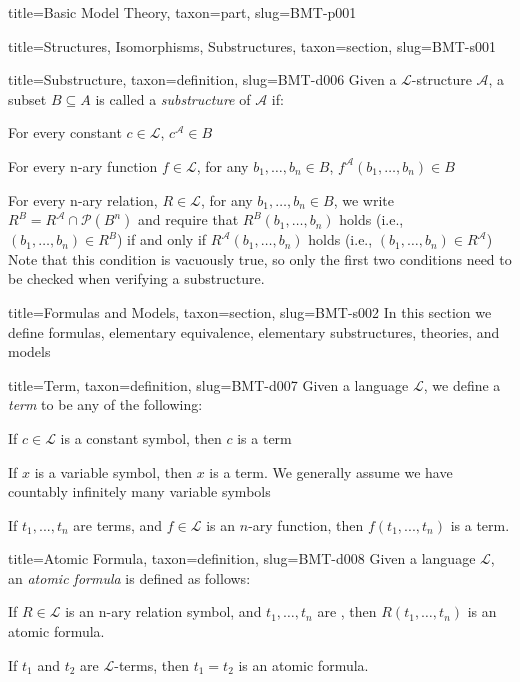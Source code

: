 \documentclass[a4paper]{article}
\begin{document}
\begin{tree}{title={Basic Model Theory}, taxon={part}, slug={BMT-p001}}
\begin{tree}{title={Structures, Isomorphisms, Substructures}, taxon={section}, slug={BMT-s001}}
\begin{tree}{title={Substructure}, taxon={definition}, slug={BMT-d006}}
Given a \(\mathcal {L}\)-structure \(\mathcal {A}\), a subset \(B  \subseteq  A\) is called a \emph{substructure} of \(\mathcal {A}\) if:\par{For every constant \(c \in   \mathcal {L}\), \(c^{ \mathcal {A}}  \in  B\)}\par{For every n-ary function \(f \in   \mathcal {L}\), for any \(b_1, \dots , b_n  \in  B\), \(f^{ \mathcal {A}}(b_1, \dots ,b_n)  \in  B\)}\par{For every n-ary relation, \(R \in   \mathcal {L}\), for any \(b_1, \dots , b_n  \in  B\), we write \(R^B = R^{ \mathcal {A}} \cap   \mathcal {P}(B^n)\) and require that
\(R^{B}(b_1, \dots , b_n)\) holds (i.e., \((b_1, \dots , b_n)  \in  R^{B}\))  if and only if \(R^{ \mathcal {A}}(b_1, \dots , b_n)\) holds (i.e., \((b_1, \dots , b_n)  \in  R^{ \mathcal {A}}\)) 
Note that this condition is vacuously true, so only the first two conditions need to be checked when verifying a substructure.}
\end{tree}

\end{tree}


  
  
\begin{tree}{title={Formulas and Models}, taxon={section}, slug={BMT-s002}}
In this section we define formulas, elementary equivalence, elementary substructures, theories, and models
\begin{tree}{title={Term}, taxon={definition}, slug={BMT-d007}}
Given a language \(\mathcal {L}\), we define a \emph{term} to be any of the following:\par{If \(c \in   \mathcal {L}\) is a constant symbol, then \(c\) is a term}\par{If \(x\) is a variable symbol, then \(x\) is a term. We generally assume we have countably infinitely many variable symbols}\par{If \(t_1,..., t_n\) are terms, and \(f \in   \mathcal {L}\) is an \(n\)-ary function, then \(f(t_1,..., t_n)\) is a term.}
\end{tree}

\begin{tree}{title={Atomic Formula}, taxon={definition}, slug={BMT-d008}}
Given a language \(\mathcal {L}\), an \emph{atomic formula} is defined as follows:\par{If \(R \in   \mathcal {L}\) is an n-ary relation symbol, and \(t_1, \dots , t_n\) are , then \(R(t_1, \dots , t_n)\) is an atomic formula.}\par{If \(t_1\) and \(t_2\) are \(\mathcal {L}\)-terms, then \(t_1 = t_2\) is an atomic formula. }
\end{tree}


\end{tree}
\end{tree}
\end{document}
